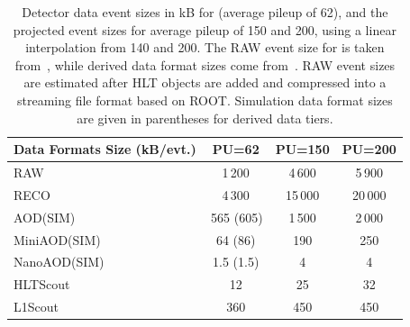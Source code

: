 \begin{table}[tbhp]
    \centering
    \caption{
    Detector data event sizes in kB for \RunThree (average pileup of 62), and the projected event sizes for average pileup of 150 and 200, using a linear interpolation from 140 and 200. The \gls{RAW} event size for \PhaseTwo is taken from~\cite{CMS:2021DAQTDR}, while derived data format sizes come from~\cite{Software:2815292}. \gls{RAW} event sizes are estimated after \gls{HLT} objects are added and compressed into a streaming file format based on \textsc{ROOT}. Simulation data format sizes are given in parentheses for derived data tiers.}
    \begin{tabular}{|l|c|c|c|}
    \hline
    \rowcolor{tableheader} 
           Data Formats Size (kB/evt.) & PU=62    & PU=150  & PU=200  \\ \hline
    \cellcolor{tablerowheader}
           RAW                   &  1\,200        & 4\,600        &  5\,900  \\
    \cellcolor{tablerowheader}
           RECO                  &  4\,300        &  15\,000      & 20\,000        \\
    \cellcolor{tablerowheader}
           AOD(SIM)              & \,565 (605)    & 1\,500        &  2\,000  \\
    \cellcolor{tablerowheader}
           MiniAOD(SIM)                & 64 (86)        & 190           &  250    \\
    \cellcolor{tablerowheader}
           NanoAOD(SIM)                & 1.5 (1.5)      &  4            &  4      \\
    \cellcolor{tablerowheader}
           HLTScout                    &   12           &  25           &  32     \\
    \cellcolor{tablerowheader}
           L1Scout                     &  360           &  450          & 450     \\ \hline       
    \end{tabular}
    \label{tab:event-sizes}
\end{table}

